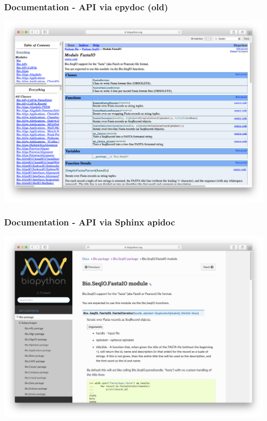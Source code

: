 \begin{frame}
\frametitle{Documentation - API via epydoc (old)}
\vspace{-0.8cm}
\includegraphics[width=\textwidth]{images/epydoc}
\end{frame}

\begin{frame}
\frametitle{Documentation - API via Sphinx apidoc}
\vspace{-0.8cm}
\includegraphics[width=\textwidth]{images/sphinx-apidoc}
\end{frame}

